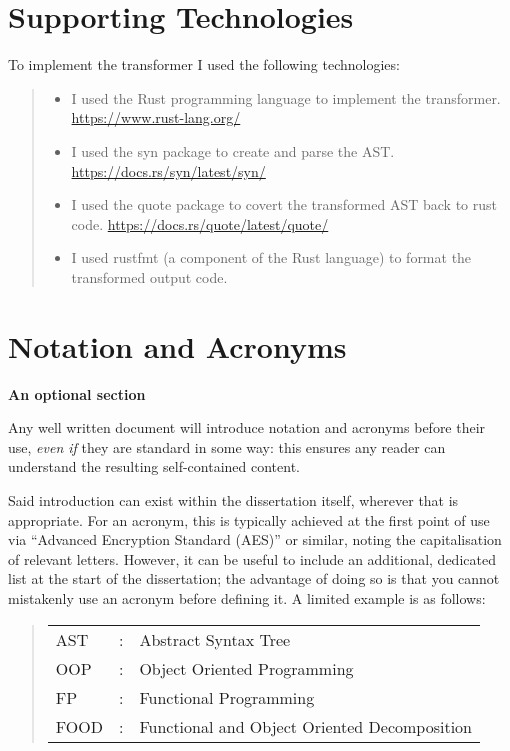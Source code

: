 \documentclass[ oneside,%
                    author={James Elgar},
                    degree={MEng},
                     title={Bidirectional transformer between functional and \\ object-oriented programming in Rust},
                  subtitle={}]{dissertation}
\begin{document}
\chapter*{Supporting Technologies}

\noindent
To implement the transformer I used the following technologies:

\begin{quote}
\noindent
\begin{itemize}
\item I used the Rust programming language to implement the transformer. \url{https://www.rust-lang.org/}
\item I used the syn package to create and parse the AST. \url{https://docs.rs/syn/latest/syn/}
\item I used the quote package to covert the transformed AST back to rust code. \url{https://docs.rs/quote/latest/quote/}
\item I used rustfmt (a component of the Rust language) to format the transformed output code.
\end{itemize}
\end{quote}


\chapter*{Notation and Acronyms}

{\bf An optional section}
\vspace{1cm} 

\noindent
Any well written document will introduce notation and acronyms before
their use, {\em even if} they are standard in some way: this ensures 
any reader can understand the resulting self-contained content.  

Said introduction can exist within the dissertation itself, wherever 
that is appropriate.  For an acronym, this is typically achieved at 
the first point of use via ``Advanced Encryption Standard (AES)'' or 
similar, noting the capitalisation of relevant letters.  However, it 
can be useful to include an additional, dedicated list at the start 
of the dissertation; the advantage of doing so is that you cannot 
mistakenly use an acronym before defining it.  A limited example is 
as follows:

\begin{quote}
\noindent
\begin{tabular}{lcl}
AST                 &:     & Abstract Syntax Tree                                        \\
OOP                 &:     & Object Oriented Programming                                 \\
FP                  &:     & Functional Programming                                      \\
FOOD                &:     & Functional and Object Oriented Decomposition                \\
\end{tabular}
\end{quote}
\end{document}
